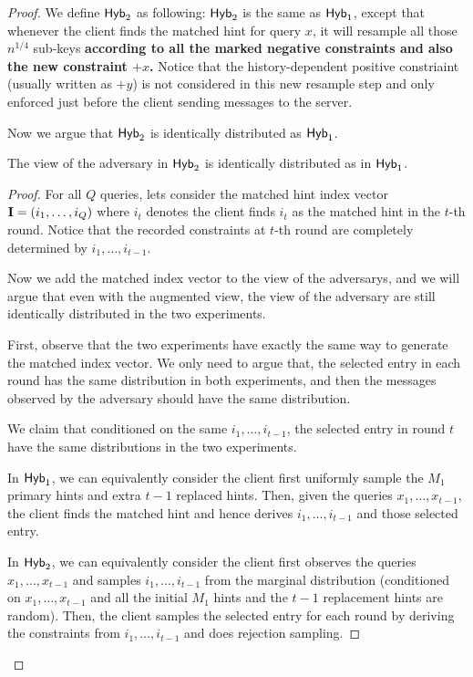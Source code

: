 \begin{proof}
    We define ${\sf Hyb}_2$ as following: ${\sf Hyb}_2$ is the same as ${\sf Hyb}_1$, except that whenever the client finds the matched hint for query $x$, it will resample all those $n^{1/4}$ sub-keys \textbf{according to all the marked negative constraints and also the new constraint $+x$.} Notice that the history-dependent positive constriaint (usually written as $+y$) is not considered in this new resample step and only enforced just before the client sending messages to the server. 
    
    Now we argue that ${\sf Hyb}_2$ is identically distributed as ${\sf Hyb}_1$. 
    
    \begin{myclaim}
        The view of the adversary in ${\sf Hyb}_2$ is identically distributed as in ${\sf Hyb}_1$. 
        \label{clm:resamp-const}
    \end{myclaim}
    
    \begin{proof}
        For all $Q$ queries, lets consider the matched hint index vector ${\bf I}=(i_1,\dots,
        i_Q)$ where $i_t$ denotes the client finds $i_t$ as the matched hint in the $t$-th round. Notice that the recorded constraints at $t$-th round are completely determined by $i_1,\dots,i_{t-1}$.
        
        Now we add the matched index vector to the view of the adversarys, and we will argue that even with the augmented view, the view of the adversary are still identically distributed in the two experiments.
        
        First, observe that the two experiments have exactly the same way to generate the matched index vector.
        We only need to argue that, the selected entry in each round has the same distribution in both experiments, and then the messages observed by the adversary should have the same distribution.
        
        We claim that conditioned on the same $i_1,\dots,i_{t-1}$, the selected entry in round $t$ have the same distributions in the two experiments.
        
        In ${\sf Hyb}_1$, we can equivalently consider the client first uniformly sample the $M_1$ primary hints and extra $t-1$ replaced hints.
        Then, given the queries $x_1,\dots,x_{t-1}$, the client finds the matched hint and hence derives $i_1,\dots,i_{t-1}$ and those selected entry.
        
        In ${\sf Hyb}_2$, we can equivalently consider the client first observes the queries $x_1,\dots,x_{t-1}$ and samples $i_1,\dots,i_{t-1}$ from the marginal distribution (conditioned on $x_1,\dots,x_{t-1}$ and all the initial $M_1$ hints and the $t-1$ replacement hints are random).
        Then, the client samples the selected entry for each round by deriving the constraints from $i_1,\dots,i_{t-1}$ and does rejection sampling.
        

\end{proof}
\end{proof}
